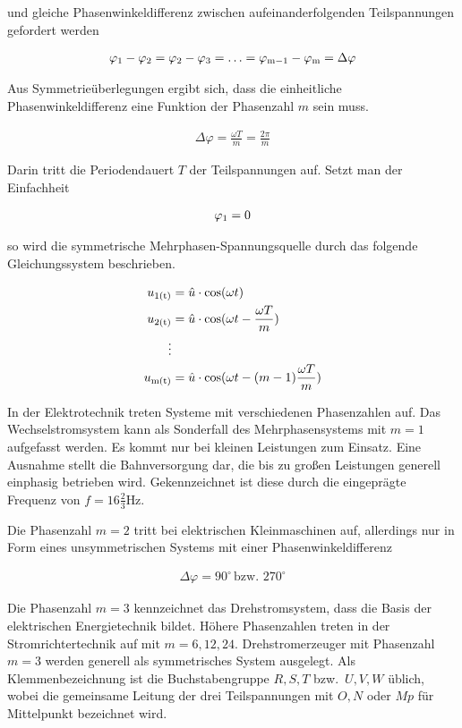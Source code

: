 und gleiche Phasenwinkeldifferenz zwischen aufeinanderfolgenden Teilspannungen gefordert werden

\begin{align*}
\varphi_{\mathrm{1}} - \varphi_{\mathrm{2}} = \varphi_{\mathrm{2}} - \varphi_{\mathrm{3}} = \ldots = \varphi_{\mathrm{m-1}} - \varphi_{\mathrm{m}} = \Delta \varphi
\end{align*}

Aus Symmetrieüberlegungen ergibt sich, dass die einheitliche Phasenwinkeldifferenz eine Funktion der Phasenzahl $m$ sein muss.

\begin{align}
\Delta \varphi = \frac{\omega T}{m} = \frac{2\pi}{m}
\end{align}

Darin tritt die Periodendauert $T$ der Teilspannungen auf.
Setzt man der Einfachheit

\begin{align*}
\varphi_{\mathrm{1}} = 0
\end{align*}

so wird die symmetrische Mehrphasen-Spannungsquelle durch das folgende Gleichungssystem beschrieben.

\begin{align}
u_{\mathrm{1(t)}} &= \hat{u} \cdot \cos(\omega t) \\ \label{eqn:drehstrom}
u_{\mathrm{2(t)}} &= \hat{u} \cdot \cos(\omega t - \frac{\omega T}{m})\nonumber \\
\vdots \nonumber \\
u_{\mathrm{m(t)}} &= \hat{u} \cdot \cos(\omega t - (m-1)\frac{\omega T}{m})\nonumber
\end{align}

In der Elektrotechnik treten Systeme mit verschiedenen Phasenzahlen auf.
Das Wechselstromsystem kann als Sonderfall des Mehrphasensystems mit $m=1$ aufgefasst werden.
Es kommt nur bei kleinen Leistungen zum Einsatz.
Eine Ausnahme stellt die Bahnversorgung dar, die bis zu großen Leistungen generell einphasig betrieben wird.
Gekennzeichnet ist diese durch die eingeprägte Frequenz von $f = 16\frac{2}{3}\mbox{Hz}$.

Die Phasenzahl $m=2$ tritt bei elektrischen Kleinmaschinen auf, allerdings nur in Form eines unsymmetrischen Systems mit einer Phasenwinkeldifferenz

\begin{align*}
\Delta \varphi = 90^{\circ} \,\text{bzw.\ } 270^{\circ}
\end{align*}

Die Phasenzahl $m=3$ kennzeichnet das Drehstromsystem, dass die Basis der elektrischen Energietechnik bildet.
Höhere Phasenzahlen treten \zB in der Stromrichtertechnik auf mit $m=6, 12, 24$.
Drehstromerzeuger mit Phasenzahl $m=3$ werden generell als symmetrisches System ausgelegt.
Als Klemmenbezeichnung ist die Buchstabengruppe $R, S, T$ bzw.\ $U, V, W$ üblich, wobei die gemeinsame Leitung der drei Teilspannungen mit $O, N$ oder $Mp$ für Mittelpunkt bezeichnet wird.

